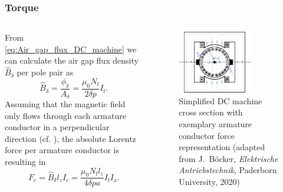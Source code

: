 \begin{frame}
	\frametitle{Torque}
	\begin{columns}
	\begin{column}{0.45\textwidth}
    From \eqref{eq:Air_gap_flux_DC_machine} we can calculate the air gap flux density $\hat{B}_\delta$ per pole pair as
	\begin{equation}
		\hat{B}_\delta = \frac{\phi_\delta}{A_\delta} = \frac{\mu_0 N_\mathrm{f}}{2 \delta p} I_\mathrm{f}.
		\label{eq:Air_gap_flux_density_DC_machine}
	\end{equation}\pause
	Assuming that the magnetic field only flows through each armature conductor in a perpendicular direction (cf. ), the absolute Lorentz force per armature conductor is resulting in
	\begin{equation}
		F_\mathrm{c} =  \hat{B}_\delta l_z I_\mathrm{c}= \frac{\mu_0 N_\mathrm{f} l_z}{4 \delta p a}I_\mathrm{f} I_\mathrm{a}.
		\label{eq:Lorentz_force_DC_machine_conductor}
	\end{equation}
\end{column}
\hfill
\begin{column}{0.55\textwidth}
	\begin{figure}
		\centering
		\includegraphics[width=0.725\textwidth]{fig/lec03/DC_machine_cross_section_force_torque.pdf}
		\caption{Simplified DC machine cross section with exemplary armature conductor force representation (adapted from J.~B\"ocker, \textit{Elektrische Antriebstechnik}, Paderborn University, 2020)}
		\label{fig:DC_machine_cross_section_force_torque}
	\end{figure}
\end{column}
\end{columns}
\end{frame}

